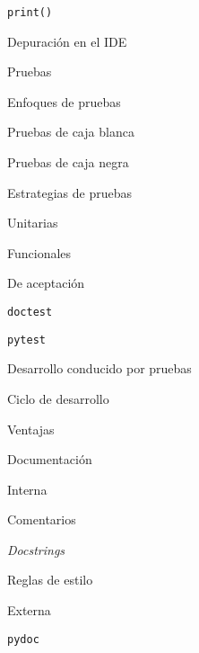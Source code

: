 \begin{longenum}
\begin{longenum}
        \begin{longenum}
            \item \texttt{print()}
            \item Depuración en el IDE
        \end{longenum}
        \item Pruebas
        \begin{longenum}
            \item Enfoques de pruebas
            \begin{longenum}
                \item Pruebas de caja blanca
                \item Pruebas de caja negra
            \end{longenum}
            \item Estrategias de pruebas
            \begin{longenum}
                \item Unitarias
                \item Funcionales
                \item De aceptación
            \end{longenum}
            \item \texttt{doctest}
            \item \texttt{pytest}
            \item Desarrollo conducido por pruebas
            \begin{longenum}
                \item Ciclo de desarrollo
                \item Ventajas
            \end{longenum}
        \end{longenum}
        \item Documentación
        \begin{longenum}
            \item Interna
            \begin{longenum}
                \item Comentarios
                \item \textit{Docstrings}
                \item Reglas de estilo
            \end{longenum}
            \item Externa
            \begin{longenum}
                \item \texttt{pydoc}

\end{longenum}
\end{longenum}
\end{longenum}
\end{longenum}
